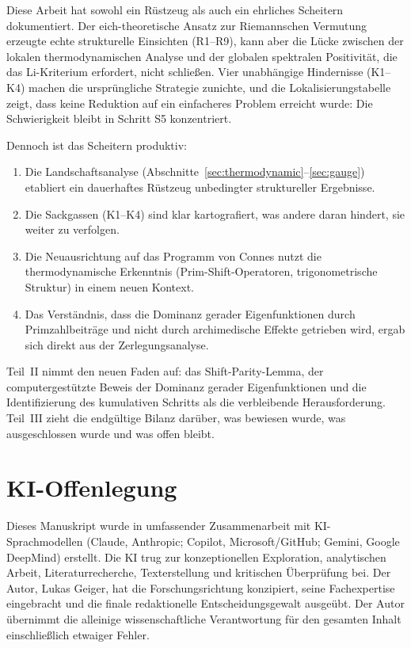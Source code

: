 \documentclass[12pt,a4paper]{article}
\theoremstyle{definition}
\theoremstyle{remark}
\begin{document}
Diese Arbeit hat sowohl ein Rüstzeug als auch ein ehrliches Scheitern dokumentiert. Der eich-theoretische Ansatz zur Riemannschen Vermutung erzeugte echte strukturelle Einsichten (R1--R9), kann aber die Lücke zwischen der lokalen thermodynamischen Analyse und der globalen spektralen Positivität, die das Li-Kriterium erfordert, nicht schließen. Vier unabhängige Hindernisse (K1--K4) machen die ursprüngliche Strategie zunichte, und die Lokalisierungstabelle zeigt, dass keine Reduktion auf ein einfacheres Problem erreicht wurde: Die Schwierigkeit bleibt in Schritt S5 konzentriert.

Dennoch ist das Scheitern produktiv:
\begin{enumerate}
  \item Die Landschaftsanalyse (Abschnitte~\ref{sec:thermodynamic}--\ref{sec:gauge}) etabliert ein dauerhaftes Rüstzeug unbedingter struktureller Ergebnisse.
  \item Die Sackgassen (K1--K4) sind klar kartografiert, was andere daran hindert, sie weiter zu verfolgen.
  \item Die Neuausrichtung auf das Programm von Connes nutzt die thermodynamische Erkenntnis (Prim-Shift-Operatoren, trigonometrische Struktur) in einem neuen Kontext.
  \item Das Verständnis, dass die Dominanz gerader Eigenfunktionen durch Primzahlbeiträge und nicht durch archimedische Effekte getrieben wird, ergab sich direkt aus der Zerlegungsanalyse.
\end{enumerate}

Teil~II nimmt den neuen Faden auf: das Shift-Parity-Lemma, der computergestützte Beweis der Dominanz gerader Eigenfunktionen und die Identifizierung des kumulativen Schritts als die verbleibende Herausforderung. Teil~III zieht die endgültige Bilanz darüber, was bewiesen wurde, was ausgeschlossen wurde und was offen bleibt.


\section*{KI-Offenlegung}

Dieses Manuskript wurde in umfassender Zusammenarbeit mit KI-Sprachmodellen (Claude, Anthropic; Copilot, Microsoft/GitHub; Gemini, Google DeepMind) erstellt. Die KI trug zur konzeptionellen Exploration, analytischen Arbeit, Literaturrecherche, Texterstellung und kritischen \"Uberpr\"ufung bei. Der Autor, Lukas Geiger, hat die Forschungsrichtung konzipiert, seine Fachexpertise eingebracht und die finale redaktionelle Entscheidungsgewalt ausge\"ubt. Der Autor \"ubernimmt die alleinige wissenschaftliche Verantwortung f\"ur den gesamten Inhalt einschlie\ss{}lich etwaiger Fehler.
\end{document}
